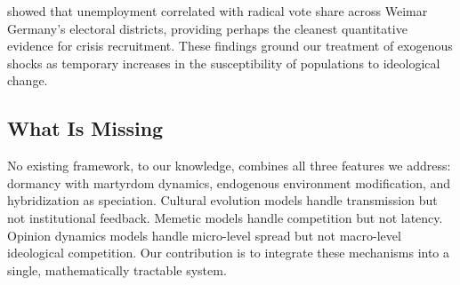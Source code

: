 \citet{king2008ordinary} showed that unemployment correlated with radical
vote share across Weimar Germany's electoral districts, providing perhaps the
cleanest quantitative evidence for crisis recruitment. These findings ground
our treatment of exogenous shocks as temporary increases in the
susceptibility of populations to ideological change.

\subsection{What Is Missing}

No existing framework, to our knowledge, combines all three features we
address: dormancy with martyrdom dynamics, endogenous environment
modification, and hybridization as speciation. Cultural evolution models
handle transmission but not institutional feedback. Memetic models handle
competition but not latency. Opinion dynamics models handle micro-level
spread but not macro-level ideological competition. Our contribution is to
integrate these mechanisms into a single, mathematically tractable system.
